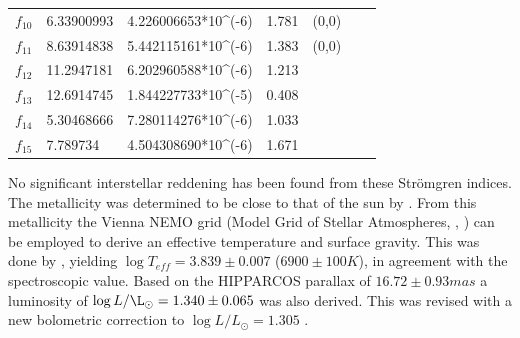 \begin{table}[htbp]
\begin{tabular}{lllllll}
$f_10$ & 6.33900993              & 4.226006653*10\textasciicircum{}(-6) & 1.781                                                          & (0,0)   &           &                       \\
$f_11$ & 8.63914838              & 5.442115161*10\textasciicircum{}(-6) & 1.383                                                          & (0,0)   &           &                       \\
$f_12$ & 11.2947181              & 6.202960588*10\textasciicircum{}(-6) & 1.213                                                          &         &           &                       \\
$f_13$ & 12.6914745              & 1.844227733*10\textasciicircum{}(-5) & 0.408                                                          &         &           &                       \\
$f_14$ & 5.30468666              & 7.280114276*10\textasciicircum{}(-6) & 1.033                                                          &         &           &                       \\
$f_15$ & 7.789734                & 4.504308690*10\textasciicircum{}(-6) & 1.671 
             
\end{tabular}
\end{table}



No significant interstellar reddening has been found from these Strömgren indices. The metallicity was determined to be close to that of the sun by \citet{mcnamara1985relations}. From this metallicity the Vienna NEMO grid (Model Grid of Stellar Atmospheres, \citet{nendwich2004interpolation}, \citet{heiter2002new}) can be employed to derive an effective temperature and surface gravity. This was done by \citet{lenz2008asteroseismic}, yielding $ \log T_{eff}= 3.839 \pm 0.007$ ($6900 \pm 100 K$), in agreement with the spectroscopic value. Based on the HIPPARCOS parallax of $16.72\pm 0.93 mas$ a luminosity of $\log L/\L_\odot = 1.340 \pm 0.065$ was also derived. This was revised with a new bolometric correction to $\log L/L_\odot = 1.305$ \citep{lenz2010delta}. 

